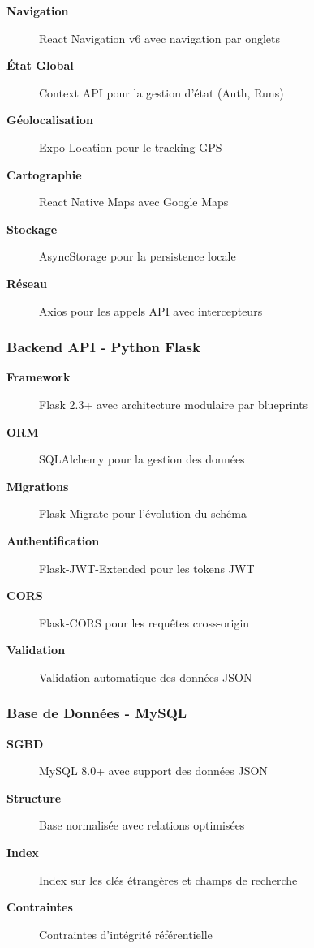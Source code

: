 \begin{description}
    \item[\textbf{Navigation}] React Navigation v6 avec navigation par onglets
    \item[\textbf{État Global}] Context API pour la gestion d'état (Auth, Runs)
    \item[\textbf{Géolocalisation}] Expo Location pour le tracking GPS
    \item[\textbf{Cartographie}] React Native Maps avec Google Maps
    \item[\textbf{Stockage}] AsyncStorage pour la persistence locale
    \item[\textbf{Réseau}] Axios pour les appels API avec intercepteurs
\end{description}

\subsubsection{Backend API - Python Flask}

\begin{description}
    \item[\textbf{Framework}] Flask 2.3+ avec architecture modulaire par blueprints
    \item[\textbf{ORM}] SQLAlchemy pour la gestion des données
    \item[\textbf{Migrations}] Flask-Migrate pour l'évolution du schéma
    \item[\textbf{Authentification}] Flask-JWT-Extended pour les tokens JWT
    \item[\textbf{CORS}] Flask-CORS pour les requêtes cross-origin
    \item[\textbf{Validation}] Validation automatique des données JSON
\end{description}

\subsubsection{Base de Données - MySQL}

\begin{description}
    \item[\textbf{SGBD}] MySQL 8.0+ avec support des données JSON
    \item[\textbf{Structure}] Base normalisée avec relations optimisées
    \item[\textbf{Index}] Index sur les clés étrangères et champs de recherche
    \item[\textbf{Contraintes}] Contraintes d'intégrité référentielle
\end{description}

